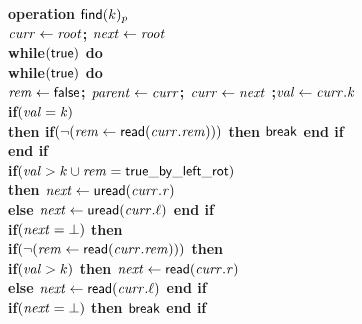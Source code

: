 \begin{figure}[h!]
{{\begin{minipage}[t]{150mm}
\begin{tabbing}
\bf{operation} $\act{find}(k)_p$ \\
		 \> $\ms{curr} \gets \ms{root}$; $\ms{next} \gets \ms{root}$ \\
		 \> \bf{while}$(\lit{true})$ \bf{do} \\
		 \>\> \bf{while}$(\lit{true})$ \bf{do} \\
		 \>\>\> $\ms{rem} \gets \lit{false}$; $\ms{parent} \gets \ms{curr}$; $\ms{curr} \gets \ms{next}$ ;$\ms{val} \gets \ms{curr.k}$ \\
		 \>\>\> \bf{if}$(\ms{val} = \ms{k})$ \\%
		 \>\>\>\> \bf{then if}$(\neg(\ms{rem} \gets \lit{read}(\ms{curr.rem})))$ {\bf then} $\lit{break}$ \bf{end if} \\%
		 \>\>\> \bf{end if} \\
		 \>\>\> \bf{if}$(\ms{val} > k \cup \ms{rem} = \lit{true\_by\_left\_rot})$ \\%
		 \>\>\>\> \bf{then} $\ms{next} \gets \lit{uread}(\ms{curr.r})$ \\%
		 \>\>\>\> \bf{else} $\ms{next} \gets \lit{uread}(\ms{curr.\ell})$ {\bf end if} \\%
		 \>\>\> \bf{if}$(\ms{next} = \bot)$ \bf{then} \\
		 \>\>\>\> \bf{if}$(\neg (\ms{rem} \gets \lit{read}(\ms{curr.rem})))$ \bf{then}\\%
		 \>\>\>\>\>\> \bf{if}$(\ms{val} > k)$ \bf{then} $\ms{next} \gets \lit{read}(\ms{curr.r})$ \\%
		 \>\>\>\>\>\>\> \bf{else} $\ms{next} \gets \lit{read}(\ms{curr.\ell})$  \bf{end if} \\%
		 \>\>\>\>\>\> \bf{if}$(\ms{next} = \bot)$ \bf{then} $\lit{break}$ \bf{end if} \\%

\end{tabbing}
\end{minipage}}}
\end{figure}
